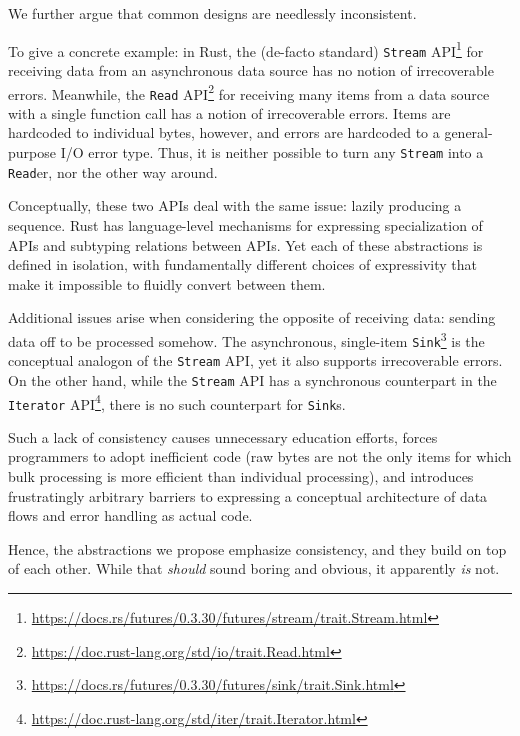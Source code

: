 \documentclass[sigplan,screen,10pt,review]{acmart}
\begin{document}
We further argue that common designs are needlessly inconsistent.

To give a concrete example: in Rust, the (de-facto standard) \texttt{Stream} API\footnote{\url{https://docs.rs/futures/0.3.30/futures/stream/trait.Stream.html}} for receiving data from an asynchronous data source has no notion of irrecoverable errors. Meanwhile, the \texttt{Read} API\footnote{\url{https://doc.rust-lang.org/std/io/trait.Read.html}} for receiving many items from a data source with a single function call has a notion of irrecoverable errors. Items are hardcoded to individual bytes, however, and errors are hardcoded to a general-purpose I/O error type. Thus, it is neither possible to turn any \texttt{Stream} into a \texttt{Read}er, nor the other way around.

Conceptually, these two APIs deal with the same issue: lazily producing a sequence. Rust has language-level mechanisms for expressing specialization of APIs and subtyping relations between APIs. Yet each of these abstractions is defined in isolation, with fundamentally different choices of expressivity that make it impossible to fluidly convert between them.

Additional issues arise when considering the opposite of receiving data: sending data off to be processed somehow. The asynchronous, single-item \texttt{Sink}\footnote{\url{https://docs.rs/futures/0.3.30/futures/sink/trait.Sink.html}} is the conceptual analogon of the \texttt{Stream} API, yet it also supports irrecoverable errors. On the other hand, while the \texttt{Stream} API has a synchronous counterpart in the \texttt{Iterator} API\footnote{\url{https://doc.rust-lang.org/std/iter/trait.Iterator.html}}, there is no such counterpart for \texttt{Sink}s.

Such a lack of consistency causes unnecessary education efforts, forces programmers to adopt inefficient code (raw bytes are not the only items for which bulk processing is more efficient than individual processing), and introduces frustratingly arbitrary barriers to expressing a conceptual architecture of data flows and error handling as actual code.

Hence, the abstractions we propose emphasize consistency, and they build on top of each other. While that \textit{should} sound boring and obvious, it apparently \textit{is} not.
\end{document}
